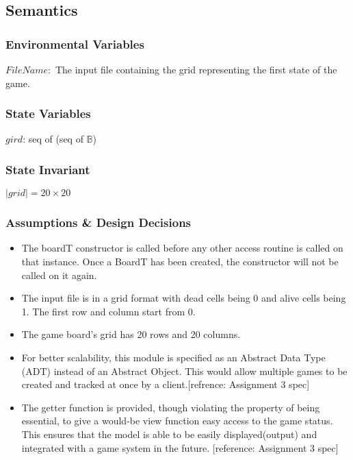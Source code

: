 \documentclass[12pt]{article}
\begin{document}
\subsection* {Semantics}
\subsubsection* {Environmental Variables}
$FileName:$ The input file containing the grid representing the first state of the game.

\subsubsection* {State Variables}

$gird$: seq of (seq of $\mathbb{B}$)

\subsubsection* {State Invariant}

$|grid| = 20\times20$\\

\subsubsection* {Assumptions \& Design Decisions}

\begin{itemize}

\item The boardT constructor is called before any other access routine is called on that
instance. Once a BoardT has been created, the constructor will not be called on it again.\\

\item The input file is in a grid format with dead cells being 0 and alive cells being 1. 
The first row and column start from 0.\\

\item The game board's grid has 20 rows and 20 columns.\\ 

\item For better scalability, this module is specified as an Abstract Data Type
  (ADT) instead of an Abstract Object. This would allow multiple games to be
  created and tracked at once by a client.[refrence: Assignment 3 spec]

\item The getter function is provided, though violating the property of being
  essential, to give a would-be view function easy access to the game status. This ensures that the model is able to be easily displayed(output) and integrated with a game
  system in the future. [reference: Assignment 3 spec]

\end{itemize}
\end{document}
